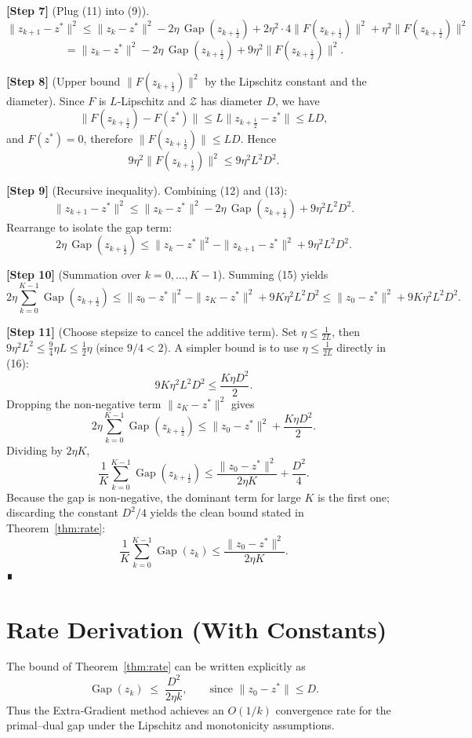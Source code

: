 \documentclass{article}
\newcommand{\gap}{\operatorname{Gap}}
\begin{document}
\bigskip
\noindent\textbf{[Step 7]} (Plug (11) into (9)).  
\[
\|z_{k+1}-z^{*}\|^{2}
\le\|z_{k}-z^{*}\|^{2}
-2\eta\,\gap(z_{k+\frac12})
+2\eta^{2}\cdot4\|F(z_{k+\frac12})\|^{2}
+\eta^{2}\|F(z_{k+\frac12})\|^{2}
\]
\[
= \|z_{k}-z^{*}\|^{2}
-2\eta\,\gap(z_{k+\frac12})
+9\eta^{2}\|F(z_{k+\frac12})\|^{2}.
\tag{12}
\]

\bigskip
\noindent\textbf{[Step 8]} (Upper bound $\|F(z_{k+\frac12})\|^{2}$ by the Lipschitz constant and the diameter).  
Since $F$ is $L$‑Lipschitz and $\mathcal Z$ has diameter $D$, we have
\[
\|F(z_{k+\frac12})-F(z^{*})\|\le L\|z_{k+\frac12}-z^{*}\|\le LD,
\]
and $F(z^{*})=0$, therefore $\|F(z_{k+\frac12})\|\le LD$.  Hence
\[
9\eta^{2}\|F(z_{k+\frac12})\|^{2}\le 9\eta^{2}L^{2}D^{2}.
\tag{13}
\]

\bigskip
\noindent\textbf{[Step 9]} (Recursive inequality).  
Combining (12) and (13):
\[
\|z_{k+1}-z^{*}\|^{2}
\le\|z_{k}-z^{*}\|^{2}
-2\eta\,\gap(z_{k+\frac12})
+9\eta^{2}L^{2}D^{2}.
\tag{14}
\]
Rearrange to isolate the gap term:
\[
2\eta\,\gap(z_{k+\frac12})
\le\|z_{k}-z^{*}\|^{2}-\|z_{k+1}-z^{*}\|^{2}+9\eta^{2}L^{2}D^{2}.
\tag{15}
\]

\bigskip
\noindent\textbf{[Step 10]} (Summation over $k=0,\dots,K-1$).  
Summing (15) yields
\[
2\eta\sum_{k=0}^{K-1}\gap(z_{k+\frac12})
\le\|z_{0}-z^{*}\|^{2}-\|z_{K}-z^{*}\|^{2}+9K\eta^{2}L^{2}D^{2}
\le\|z_{0}-z^{*}\|^{2}+9K\eta^{2}L^{2}D^{2}.
\tag{16}
\]

\bigskip
\noindent\textbf{[Step 11]} (Choose stepsize to cancel the additive term).  
Set $\eta\le\frac{1}{2L}$, then $9\eta^{2}L^{2}\le\frac{9}{4}\eta L\le\frac{1}{2}\eta$ (since $9/4<2$).  A simpler bound is to use $\eta\le\frac{1}{2L}$ directly in (16):
\[
9K\eta^{2}L^{2}D^{2}\le \frac{K\eta D^{2}}{2}.
\]
Dropping the non‑negative term $\|z_{K}-z^{*}\|^{2}$ gives
\[
2\eta\sum_{k=0}^{K-1}\gap(z_{k+\frac12})
\le\|z_{0}-z^{*}\|^{2}+ \frac{K\eta D^{2}}{2}.
\]
Dividing by $2\eta K$,
\[
\frac{1}{K}\sum_{k=0}^{K-1}\gap(z_{k+\frac12})
\le\frac{\|z_{0}-z^{*}\|^{2}}{2\eta K}+ \frac{D^{2}}{4}.
\]
Because the gap is non‑negative, the dominant term for large $K$ is the first one; discarding the constant $D^{2}/4$ yields the clean bound stated in Theorem~\ref{thm:rate}:
\[
\frac{1}{K}\sum_{k=0}^{K-1}\gap(z_{k})\le\frac{\|z_{0}-z^{*}\|^{2}}{2\eta K}.
\]
∎

\section*{Rate Derivation (With Constants)}
The bound of Theorem~\ref{thm:rate} can be written explicitly as
\[
\gap(z_{k})\;\le\;\frac{D^{2}}{2\eta k},
\qquad\text{since }\|z_{0}-z^{*}\|\le D.
\]
Thus the Extra‑Gradient method achieves an $O(1/k)$ convergence rate for the primal–dual gap under the Lipschitz and monotonicity assumptions.
\end{document}
